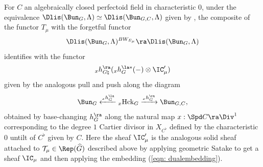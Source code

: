 \documentclass[letterpaper,11pt]{amsart}
\begin{document}
For $C$ an algebraically closed perfectoid field in characteristic $0$, under the equivalence $\Dlis(\Bun_{G},\Lambda) \simeq \Dlis(\Bun_{G,C},\Lambda)$ given by \cite[Corollary~V.2.3]{FSGeomLLC}, the composite of the functor $T_{\mu}$ with the forgetful functor 
\[ \Dlis(\Bun_{G},\Lambda)^{BW_{E_{\mu}}} \ra \Dlis(\Bun_{G},\Lambda) \]
identifies with the functor
\[ \phantom{}_{x}h^{\ra}_{G\natural}(\phantom{}_{x}h^{\la*}_{G}(-) \otimes \IC'_{\mu}) \] 
given by the analogous pull and push along the diagram
\begin{equation}{\label{eqn: basechangedHeckeDiagram}}
\Bun_{G} \xleftarrow{\phantom{}_{x}h^{\la}_{G}} \phantom{}_{x}\mathrm{Hck}_{G} \xrightarrow{\phantom{}_{x}h^{\ra}_{G}} \Bun_{G,C}, 
\end{equation}
obtained by base-changing $h^{\ra}_{G}$ along the natural map $x: \Spd C \ra \Div^{1}$ corresponding to the degree $1$ Cartier divisor in $X_{C^{\flat}}$ defined by the characteristic $0$ untilt of $C^{\flat}$ given by $C$. Here the sheaf $\IC'_{\mu}$ is the analogous solid sheaf attached to $\mathcal{T}_{\mu} \in \Rep(\widehat{G})$ described above by applying geometric Satake to get a sheaf $\IC_{\mu}$ and then applying the embedding (\ref{eqn: dualembedding}).
\end{document}
